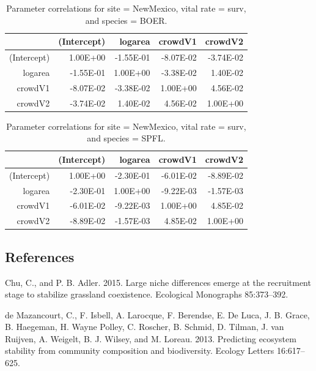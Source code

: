 \documentclass[12pt,]{article}
\begin{document}
\begin{table}[ht]
\centering
\caption{Parameter correlations for site = NewMexico, vital rate = surv, and species = BOER.} 
\begin{tabular}{rrrrr}
  \hline
 & (Intercept) & logarea & crowdV1 & crowdV2 \\ 
  \hline
(Intercept) & 1.00E+00 & -1.55E-01 & -8.07E-02 & -3.74E-02 \\ 
  logarea & -1.55E-01 & 1.00E+00 & -3.38E-02 & 1.40E-02 \\ 
  crowdV1 & -8.07E-02 & -3.38E-02 & 1.00E+00 & 4.56E-02 \\ 
  crowdV2 & -3.74E-02 & 1.40E-02 & 4.56E-02 & 1.00E+00 \\ 
   \hline
\end{tabular}
\end{table}

\begin{table}[ht]
\centering
\caption{Parameter correlations for site = NewMexico, vital rate = surv, and species = SPFL.} 
\begin{tabular}{rrrrr}
  \hline
 & (Intercept) & logarea & crowdV1 & crowdV2 \\ 
  \hline
(Intercept) & 1.00E+00 & -2.30E-01 & -6.01E-02 & -8.89E-02 \\ 
  logarea & -2.30E-01 & 1.00E+00 & -9.22E-03 & -1.57E-03 \\ 
  crowdV1 & -6.01E-02 & -9.22E-03 & 1.00E+00 & 4.85E-02 \\ 
  crowdV2 & -8.89E-02 & -1.57E-03 & 4.85E-02 & 1.00E+00 \\ 
   \hline
\end{tabular}
\end{table}

\newpage{}

\subsection*{References}\label{references}

Chu, C., and P. B. Adler. 2015. Large niche differences emerge at the
recruitment stage to stabilize grassland coexistence. Ecological
Monographs 85:373--392.

{{de Mazancourt}}, C., F. Isbell, A. Larocque, F. Berendse, E. {De
Luca}, J. B. Grace, B. Haegeman, H. {Wayne Polley}, C. Roscher, B.
Schmid, D. Tilman, J. van Ruijven, A. Weigelt, B. J. Wilsey, and M.
Loreau. 2013. Predicting ecosystem stability from community composition
and biodiversity. Ecology Letters 16:617--625.
\end{document}
